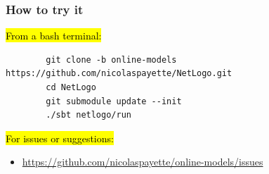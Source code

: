 \documentclass{beamer}
\begin{document}
\begin{frame}[fragile]\frametitle{How to try it}
  \begin{adjustwidth}{-6mm}{0mm}
    \hl{\larger From a bash terminal:}
    \vspace{1em}
    \begin{adjustwidth}{-12mm}{0mm}\footnotesize
      \begin{verbatim}
        git clone -b online-models https://github.com/nicolaspayette/NetLogo.git
        cd NetLogo
        git submodule update --init
        ./sbt netlogo/run
      \end{verbatim}
    \end{adjustwidth}
    \vspace{2em}
    \hl{\larger For issues or suggestions:}

    \begin{itemize}\small
      \item \url{https://github.com/nicolaspayette/online-models/issues}
    \end{itemize}

  \end{adjustwidth}
\end{frame}
\end{document}
